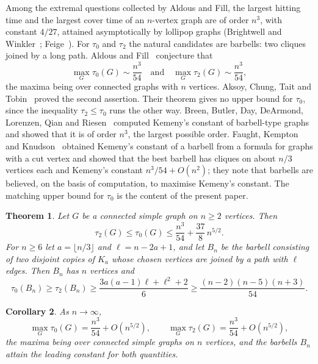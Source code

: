 \documentclass[11pt]{amsart}
\newtheorem{theorem}{Theorem}[section]
\newtheorem{corollary}[theorem]{Corollary}
\theoremstyle{definition}
\theoremstyle{remark}
\numberwithin{equation}{section}
\begin{document}
Among the extremal questions collected by Aldous and Fill, the largest hitting time and the largest cover time of an $n$-vertex graph are of order $n^3$, with constant $4/27$, attained asymptotically by lollipop graphs (Brightwell and Winkler~\cite{BW}; Feige~\cite{Fe}). For $\tau_0$ and $\tau_2$ the natural candidates are barbells: two cliques joined by a long path. Aldous and Fill~\cite[Open Problem~6.13]{AF} conjecture that
\[
\max_G\tau_0(G)\sim\frac{n^3}{54}\quad\text{and}\quad\max_G\tau_2(G)\sim\frac{n^3}{54},
\]
the maxima being over connected graphs with $n$ vertices. Aksoy, Chung, Tait and Tobin~\cite{ACTT} proved the second assertion. Their theorem gives no upper bound for $\tau_0$, since the inequality $\tau_2\le\tau_0$ runs the other way. Breen, Butler, Day, DeArmond, Lorenzen, Qian and Riesen~\cite{BBD} computed Kemeny's constant of barbell-type graphs and showed that it is of order $n^3$, the largest possible order. Faught, Kempton and Knudson~\cite{FKK} obtained Kemeny's constant of a barbell from a formula for graphs with a cut vertex and showed that the best barbell has cliques on about $n/3$ vertices each and Kemeny's constant $n^3/54+O(n^2)$; they note that barbells are believed, on the basis of computation, to maximise Kemeny's constant. The matching upper bound for $\tau_0$ is the content of the present paper.

\begin{theorem}\label{thm:main}
Let $G$ be a connected simple graph on $n\ge2$ vertices. Then
\begin{equation}\label{eq:upper}
\tau_2(G)\le\tau_0(G)\le\frac{n^3}{54}+\frac{37}{8}\,n^{5/2}.
\end{equation}
For $n\ge6$ let $a=\lfloor n/3\rfloor$ and $\ell=n-2a+1$, and let $B_n$ be the barbell consisting of two disjoint copies of $K_a$ whose chosen vertices are joined by a path with $\ell$ edges. Then $B_n$ has $n$ vertices and
\begin{equation}\label{eq:lower}
\tau_0(B_n)\ge\tau_2(B_n)\ge\frac{3a(a-1)\ell+\ell^2+2}{6}\ge\frac{(n-2)(n-5)(n+3)}{54}.
\end{equation}
\end{theorem}

\begin{corollary}\label{cor:asym}
As $n\to\infty$,
\[
\max_G\tau_0(G)=\frac{n^3}{54}+O(n^{5/2}),\qquad \max_G\tau_2(G)=\frac{n^3}{54}+O(n^{5/2}),
\]
the maxima being over connected simple graphs on $n$ vertices, and the barbells $B_n$ attain the leading constant for both quantities.
\end{corollary}
\end{document}
